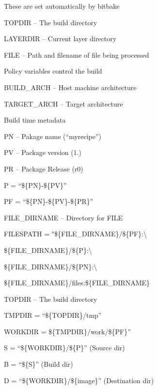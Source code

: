 \begin{DoxyItemize}
\item These are set automatically by bitbake
\begin{DoxyItemize}
\item T\+O\+P\+D\+IR – The build directory
\item L\+A\+Y\+E\+R\+D\+IR – Current layer directory
\item F\+I\+LE – Path and filename of file being processed
\end{DoxyItemize}
\item Policy variables control the build
\begin{DoxyItemize}
\item B\+U\+I\+L\+D\+\_\+\+A\+R\+CH – Host machine architecture
\item T\+A\+R\+G\+E\+T\+\_\+\+A\+R\+CH – Target architecture
\end{DoxyItemize}
\item Build time metadata
\begin{DoxyItemize}
\item PN – Pakage name (“myrecipe”)
\item PV – Package version (1.)
\item PR – Package Release (r0)
\item P = “\$\{PN\}-\/\$\{PV\}”
\item PF = “\$\{PN\}-\/\$\{PV\}-\/\$\{PR\}”
\item F\+I\+L\+E\+\_\+\+D\+I\+R\+N\+A\+ME – Directory for F\+I\+LE
\item F\+I\+L\+E\+S\+P\+A\+TH = "\$\{F\+I\+L\+E\+\_\+\+D\+I\+R\+N\+A\+ME\}/\$\{PF\}\+:\textbackslash{}
\item \$\{F\+I\+L\+E\+\_\+\+D\+I\+R\+N\+A\+ME\}/\$\{P\}\+:\textbackslash{}
\item \$\{F\+I\+L\+E\+\_\+\+D\+I\+R\+N\+A\+ME\}/\$\{PN\}\+:\textbackslash{}
\item \$\{F\+I\+L\+E\+\_\+\+D\+I\+R\+N\+A\+ME\}/files\+:\$\{F\+I\+L\+E\+\_\+\+D\+I\+R\+N\+A\+ME\}
\item T\+O\+P\+D\+IR – The build directory
\item T\+M\+P\+D\+IR = “\$\{T\+O\+P\+D\+IR\}/tmp”
\item W\+O\+R\+K\+D\+IR = \$\{T\+M\+P\+D\+IR\}/work/\$\{PF\}”
\item S = “\$\{W\+O\+R\+K\+D\+IR\}/\$\{P\}” (Source dir)
\item B = “\$\{S\}” (Build dir)
\item D = “\$\{W\+O\+R\+K\+D\+IR\}/\$\{image\}” (Destination dir)

\end{DoxyItemize}
\end{DoxyItemize}

